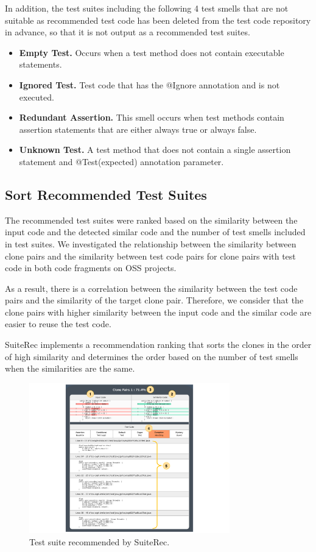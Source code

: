 \documentclass[conference]{IEEEtran}
\begin{document}
In addition, the test suites including the following 4 test smells that are not suitable as recommended test code has been deleted from the test code repository in advance, so that it is not output as a recommended test suites.　

\begin{itemize}
\item \textbf{Empty Test. }Occurs when a test method does not contain executable statements.
\item \textbf{Ignored Test. }Test code that has the @Ignore annotation and is not executed.
\item \textbf{Redundant Assertion. }This smell occurs when test methods contain assertion statements that are either always true or always false. 
\item \textbf{Unknown Test. }A test method that does not contain a single assertion statement and @Test(expected) annotation parameter.
\end{itemize}

\subsection{Sort Recommended Test Suites}
The recommended test suites were ranked based on the similarity between the input code and the detected similar code and the number of test smells included in test suites. We investigated the relationship between the similarity between clone pairs and the similarity between test code pairs for clone pairs with test code in both code fragments on OSS projects.

As a result, there is a correlation between the similarity between the test code pairs and the similarity of the target clone pair. Therefore, we consider that the clone pairs with higher similarity between the input code and the similar code are easier to reuse the test code.

SuiteRec implements a recommendation ranking that sorts the clones in the order of high similarity and determines the order based on the number of test smells when the similarities are the same.

\begin{figure}[htbp]
\centerline{\includegraphics[width=8.7cm]{SuiteRec.pdf}}
\caption{Test suite recommended by SuiteRec.}
\label{fig}
\end{figure}
\end{document}
